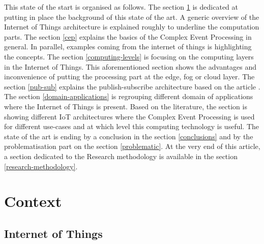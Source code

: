 \documentclass[11pt]{article}
\begin{document}
This state of the start is organised as follows. The section \ref{context} is dedicated at putting in place the background of this state of the art. A generic overview of the Internet of Things architecture is explained roughly to underline the computation parts. The section \ref{cep} explains the basics of the Complex Event Processing in general. In parallel, examples coming from the internet of things is highlighting the concepts. The section \ref{computing-levels} is focusing on the computing layers in the Internet of Things. This aforementioned section shows the advantages and inconvenience of putting the processing part at the edge, fog or cloud layer. The section \ref{pub-sub} explains the publish-subscribe architecture based on the article \cite{A-Semantic-Publish-Subscribe-Architecture}. The section \ref{domain-applications} is regrouping different domain of applications where the Internet of Things is present. Based on the literature, the section is showing different IoT architectures where the Complex Event Processing is used for different use-cases and at which level this computing technology is useful. The state of the art is ending by a conclusion in the section \ref{conclusions} and by the problematisation part on the section \ref{problematic}. At the very end of this article, a section dedicated to the Research methodology is available in the section \ref{research-methodology}.

\newpage

\section{Context} \label{context}

\subsection{Internet of Things}
\end{document}
